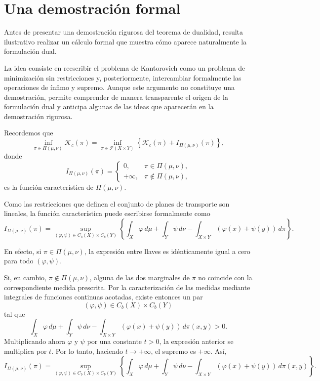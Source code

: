 \documentclass[12pt, a4paper]{amsbook}
\theoremstyle{remark}
\theoremstyle{definition}
\numberwithin{section}{chapter}
\numberwithin{subsection}{section}
\numberwithin{equation}{section}
\numberwithin{figure}{chapter}
\begin{document}
\section{Una demostración formal}

Antes de presentar una demostración rigurosa del teorema de dualidad,
resulta ilustrativo realizar un cálculo formal que muestra cómo aparece
naturalmente la formulación dual.

La idea consiste en reescribir el problema de Kantorovich como un problema
de minimización sin restricciones y, posteriormente, intercambiar
formalmente las operaciones de ínfimo y supremo. Aunque este argumento no
constituye una demostración, permite comprender de manera transparente el
origen de la formulación dual y anticipa algunas de las ideas que
aparecerán en la demostración rigurosa.

Recordemos que
\[
\inf_{\pi\in\Pi(\mu,\nu)}
\mathcal K_c(\pi)
=
\inf_{\pi\in\mathcal P(X\times Y)}
\left\{
\mathcal K_c(\pi)
+
I_{\Pi(\mu,\nu)}(\pi)
\right\},
\]
donde
\[
I_{\Pi(\mu,\nu)}(\pi)
=
\begin{cases}
0,&\pi\in\Pi(\mu,\nu),\\
+\infty,&\pi\notin\Pi(\mu,\nu),
\end{cases}
\]
es la función característica de $\Pi(\mu,\nu)$.

Como las restricciones que definen el conjunto de planes de transporte son
lineales, la función característica puede escribirse formalmente como
\[
I_{\Pi(\mu,\nu)}(\pi)
=
\sup_{(\varphi,\psi)\in C_b(X)\times C_b(Y)}
\left\{
\int_X\varphi\,d\mu
+
\int_Y\psi\,d\nu
-
\int_{X\times Y}
(\varphi(x)+\psi(y))
\,d\pi
\right\}.
\]

En efecto, si $\pi\in\Pi(\mu,\nu)$, la expresión entre llaves es
idénticamente igual a cero para todo $(\varphi,\psi)$.

Si, en cambio, $\pi\notin\Pi(\mu,\nu)$, alguna de las dos marginales de
$\pi$ no coincide con la correspondiente medida prescrita. Por la
caracterización de las medidas mediante integrales de funciones continuas
acotadas, existe entonces un par
\[
(\varphi,\psi)\in C_b(X)\times C_b(Y)
\]
tal que
\[
\int_X\varphi\,d\mu
+
\int_Y\psi\,d\nu
-
\int_{X\times Y}
(\varphi(x)+\psi(y))
\,d\pi(x,y)
>0.
\]
Multiplicando ahora $\varphi$ y $\psi$ por una constante $t>0$, la
expresión anterior se multiplica por $t$. Por lo tanto, haciendo
$t\to+\infty$, el supremo es $+\infty$. Así,
\[
I_{\Pi(\mu,\nu)}(\pi)
=
\sup_{(\varphi,\psi)\in C_b(X)\times C_b(Y)}
\left\{
\int_X\varphi\,d\mu
+
\int_Y\psi\,d\nu
-
\int_{X\times Y}
(\varphi(x)+\psi(y))
\,d\pi(x,y)
\right\}.
\]
\end{document}
